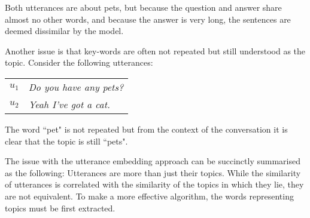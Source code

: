        Both utterances are about pets, but because the question and answer share almost no other words, and because the answer is very long, the sentences are deemed dissimilar by the model. %
        
        
        Another issue is that key-words are often not repeated but still understood as the topic. Consider the following utterances:
        
        \begin{table}[h]
            \begin{tabular}{l|l}
            $u_1$     & \textit{Do you have any pets?}                    \\
            $u_2$     & \textit{Yeah I've got a cat.}                        \\
            \end{tabular}
        \end{table}
        
        The word ``pet" is not repeated  but from the context of the conversation it is clear that the topic is still ``pets".
        
        The issue with the utterance embedding approach can be succinctly summarised as the following: Utterances are more than just their topics. While the similarity of utterances is correlated with the similarity of the topics in which they lie, they are not equivalent. To make a more effective algorithm, the words representing topics must be first extracted.
        
